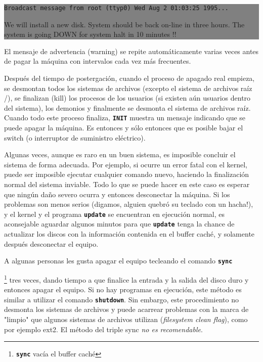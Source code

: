 \documentclass[12pt]{article}
\begin{document}
\colorbox{grey}{\parbox[t]{0.95\linewidth}{ \vspace*{0.5cm} {\tt  Broadcast message from root (ttyp0) Wed Aug  2 01:03:25 1995...


We will install a new disk.  System should be back on-line in three hours.  The
system is going DOWN for system halt in 10 minutes !!   } \vspace*{0.5cm} } } 




El mensaje de advertencia (warning)
se repite automáticamente varias veces antes de pagar la máquina con
intervalos cada vez más frecuentes.

 Después del tiempo de postergación, cuando el proceso de apagado real
empieza, se desmontan todos los sistemas de archivos (excepto el sistema de
archivos raíz /), se finalizan (kill) los procesos de los usuarios (si existen
aún usuarios dentro del sistema), los demonios y finalmente se desmonta el
sistema de archivos raíz. Cuando todo este proceso finaliza,
\texttt{\textbf{INIT}} muestra un mensaje indicando que se puede apagar la
máquina. Es entonces y sólo entonces que es posible bajar el switch (o
interruptor de suministro eléctrico).

 Algunas veces, aunque es raro en un buen sistema, es imposible concluir
el sistema de forma adecuada. Por ejemplo, si ocurre un error fatal con el
kernel, puede ser imposible ejecutar cualquier comando nuevo, haciendo la
finalización normal del sistema inviable. Todo lo que se puede hacer en este
caso es esperar que ningún daño severo ocurra y entonces desconectar la máquina.
Si los problemas son menos serios (digamos, alguien quebró su teclado con un
hacha!), y el kernel y el programa \texttt{\textbf{update}} se encuentran en
ejecución normal, es aconsejable aguardar algunos minutos para que
\texttt{\textbf{update}} tenga la chance de actualizar los discos con la
información contenida en el buffer caché, y solamente después desconectar el
equipo.  

 A algunas personas les gusta apagar el equipo tecleando el comando
\texttt{\textbf{sync}}
	
		\footnote{\texttt{\textbf{sync}} vacía el buffer caché}
		tres veces, dando tiempo a que
		finalice la entrada y la salida del disco duro y entonces apagar
		el equipo. Si no hay programas en ejecución, este método es
		similar a utilizar el comando \texttt{\textbf{shutdown}}. Sin
		embargo, este procedimiento no desmonta los sistemas de archivos
		y puede acarrear problemas con la marca de "limpio" que algunos
		sistemas de archivos utilizan (\textit{filesystem clean
		flag}), como por ejemplo ext2. El método del triple sync
		\textit{no es recomendable}.  
\end{document}
